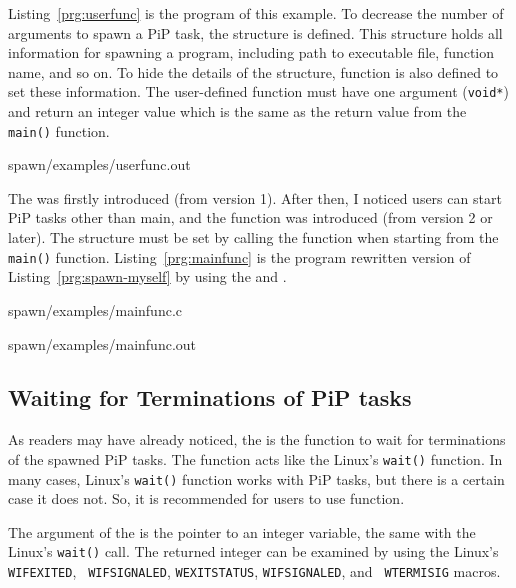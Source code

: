 Listing~\ref{prg:userfunc} is the program of this example. To decrease
the number of arguments to spawn a PiP task, the
 structure is defined. This structure
holds all information for spawning a program, including path to
executable file, function name, and so on. To hide the details of the
structure,  function is also defined
to set these information. The user-defined function must have one
argument ({\tt void*}) and return an integer value which is the same
as the return value from the {\tt main()} function.

 {spawn/examples/userfunc.out}

The  was firstly introduced (from version
1). After then, I noticed users can start PiP tasks other than main,
and the  function was
introduced (from version 2 or later). The
 structure must be set 
by calling the  function when
starting from the {\tt main()} function. Listing~\ref{prg:mainfunc} is
the program rewritten version of Listing~\ref{prg:spawn-myself} by
using the  and
.


                {spawn/examples/mainfunc.c}

 {spawn/examples/mainfunc.out}


\subsection{Waiting for Terminations of PiP tasks}

As readers may have already noticed, the  is the
function to wait for terminations of the spawned PiP tasks. The
 function acts like the Linux's {\tt wait()}
function. In many cases, Linux's {\tt wait()} function works with PiP
tasks, but there is a certain case it does not. So, it is recommended
for users to use  function.

The argument of the  is the pointer to an integer
variable, the same with the Linux's {\tt wait()} call. The returned
integer can be examined by using the Linux's {\tt WIFEXITED}, {\tt
  WIFSIGNALED}, {\tt WEXITSTATUS}, {\tt WIFSIGNALED}, and {\tt
  WTERMISIG} macros.

